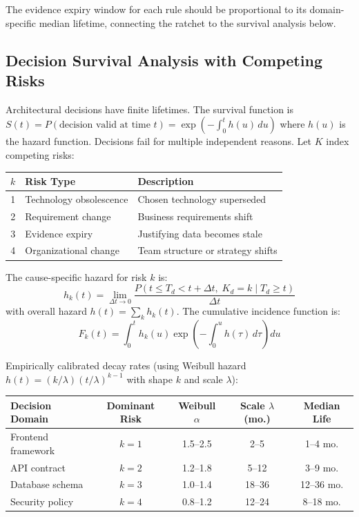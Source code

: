 The evidence expiry window for each rule should be proportional to its domain-specific median lifetime, connecting the ratchet to the survival analysis below.

\subsection{Decision Survival Analysis with Competing Risks}

Architectural decisions have finite lifetimes. The survival function is $S(t) = P(\text{decision valid at time } t) = \exp\left(-\int_0^t h(u) \, du\right)$ where $h(u)$ is the hazard function. Decisions fail for multiple independent reasons. Let $K$ index competing risks:

\begin{center}
\begin{tabular}{clp{7cm}}
\toprule
$k$ & Risk Type & Description \\
\midrule
1 & Technology obsolescence & Chosen technology superseded \\
2 & Requirement change & Business requirements shift \\
3 & Evidence expiry & Justifying data becomes stale \\
4 & Organizational change & Team structure or strategy shifts \\
\bottomrule
\end{tabular}
\end{center}

The cause-specific hazard for risk $k$ is:
\begin{equation}
    h_k(t) = \lim_{\Delta t \to 0} \frac{P(t \leq T_d < t + \Delta t, \; K_d = k \mid T_d \geq t)}{\Delta t}
\end{equation}
with overall hazard $h(t) = \sum_k h_k(t)$. The cumulative incidence function is:
\begin{equation}
    F_k(t) = \int_0^t h_k(u) \exp\!\left(-\int_0^u h(\tau)\, d\tau\right) du
\end{equation}

Empirically calibrated decay rates (using Weibull hazard $h(t) = (k/\lambda)(t/\lambda)^{k-1}$ with shape $k$ and scale $\lambda$):

\begin{center}
\begin{tabular}{lcccc}
\toprule
Decision Domain & Dominant Risk & Weibull $\alpha$ & Scale $\lambda$ (mo.) & Median Life \\
\midrule
Frontend framework & $k=1$ & 1.5--2.5 & 2--5 & 1--4 mo. \\
API contract & $k=2$ & 1.2--1.8 & 5--12 & 3--9 mo. \\
Database schema & $k=3$ & 1.0--1.4 & 18--36 & 12--36 mo. \\
Security policy & $k=4$ & 0.8--1.2 & 12--24 & 8--18 mo. \\
\bottomrule
\end{tabular}
\end{center}

